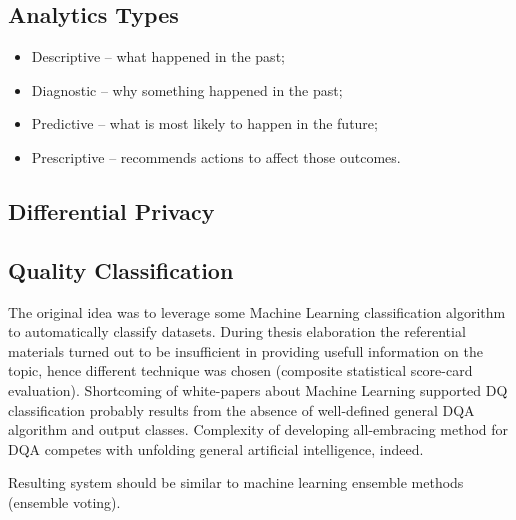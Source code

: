 \subsection{Analytics Types}

\begin{itemize}
    \item Descriptive – what happened in the past;
    \item Diagnostic – why something happened in the past;
    \item Predictive – what is most likely to happen in the future;
    \item Prescriptive – recommends actions to affect those outcomes.
\end{itemize}

\subsection{Differential Privacy}

\subsection{Quality Classification}

The original idea was to leverage some Machine Learning classification algorithm to automatically classify datasets.
During thesis elaboration the referential materials turned out to be insufficient in providing usefull information on the topic, hence different technique was chosen (composite statistical score-card evaluation).
Shortcoming of white-papers about Machine Learning supported DQ classification probably results from the absence of well-defined general DQA algorithm and output classes.
Complexity of developing all-embracing method for DQA competes with unfolding general artificial intelligence, indeed.

Resulting system should be similar to machine learning ensemble methods (ensemble voting).



